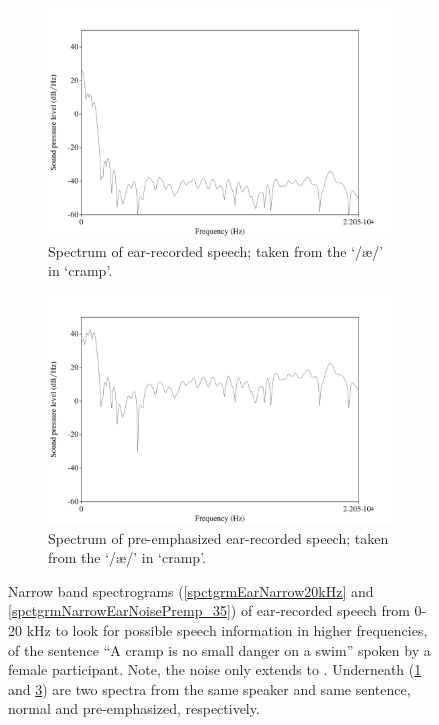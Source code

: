 \begin{figure}[h!]
\begin{subfigure}{0.475\textwidth}
  \centering
  \includegraphics[width=1\linewidth]{figure/spctrmEar20k.png}
  \caption{Spectrum of ear-recorded speech; taken from the `/\ae/' in `cramp'.}
  \label{spctrmEar20kHz}
\end{subfigure}%
\hfill
\begin{subfigure}{0.475\textwidth}
  \centering
  \includegraphics[width=1\linewidth]{figure/spctrmEar20k_preemp.png}
  \caption{Spectrum of pre-emphasized ear-recorded speech; taken from the `/\ae/' in `cramp'.}
  \label{spctrmEar20kPreemp}
\end{subfigure}
\caption{Narrow band spectrograms (\ref{spctgrmEarNarrow20kHz} and \ref{spctgrmNarrowEarNoisePremp_35}) of ear-recorded speech from 0-20 kHz to look for possible speech information in higher frequencies, of the sentence ``A cramp is no small danger on a swim'' spoken by a female participant. Note, the noise only extends to \DIFdelbeginFL {}\DIFdelendFL \DIFaddbeginFL {}\DIFaddendFL . Underneath (\ref{spctrmEar20kHz} and \ref{spctrmEar20kPreemp}) are two spectra from the same speaker and same sentence, normal and pre-emphasized, respectively.}
\end{figure}

